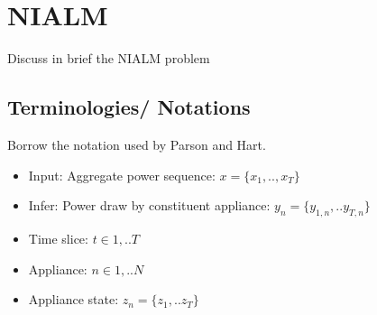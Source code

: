 \documentclass[conference]{IEEEtran}
\begin{document}


%
%


%

\section{NIALM}
Discuss in brief the NIALM problem
\subsection{Terminologies/ Notations}
Borrow the notation used by Parson and Hart.
\begin{itemize}
\item Input: Aggregate power sequence: $x=\{ x_1,..,x_T\}$
\item Infer: Power draw by constituent appliance: $y_n=\{y_{1,n},..y_{T,n}\}$
\item Time slice: $t\in {1,..T}$
\item Appliance: $n\in{1,..N}$
\item Appliance state: $z_n=\{z_1,..z_T\}$
\end{itemize}
\end{document}
